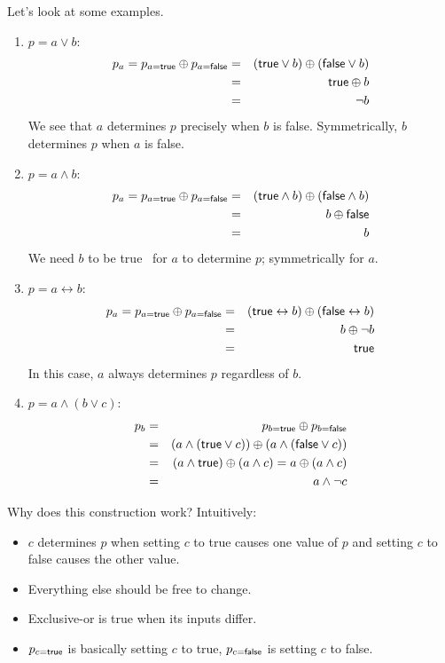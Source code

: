 \documentclass[11pt]{article}
\newcommand{\strue}{\mbox{\scriptsize \sf true}}
\newcommand{\sfalse}{\mbox{\scriptsize \sf false}}
\newcommand{\true}{\mbox{\sf true}}
\newcommand{\false}{\mbox{\sf false}}
\begin{document}
Let's look at some examples.

\begin{enumerate}
\item $p = a \vee b$:
\begin{eqnarray*}
p_a = p_{a=\strue} \oplus p_{a=\sfalse} &=& (\true \vee b) \oplus (\false \vee b) \\
&=& \true \oplus b \\
&=& \neg b
\end{eqnarray*}
We see that $a$ determines $p$ precisely when $b$ is false. Symmetrically, $b$ determines $p$ when $a$ is false.
\item $p = a \wedge b$:
\begin{eqnarray*}
p_a = p_{a=\strue} \oplus p_{a=\sfalse} &=& (\true \wedge b) \oplus (\false \wedge b) \\
&=& b \oplus \false \\
&=& b
\end{eqnarray*}
We need $b$ to be \true~ for $a$ to determine $p$; symmetrically for $a$.
\item $p = a \leftrightarrow b$:
\begin{eqnarray*}
p_a = p_{a=\strue} \oplus p_{a=\sfalse} &=& (\true \leftrightarrow b) \oplus (\false \leftrightarrow b) \\
&=& b \oplus \neg b \\
&=& \true
\end{eqnarray*}
In this case, $a$ always determines $p$ regardless of $b$.
\item $p = a \wedge (b \vee c)$:
\begin{eqnarray*}
p_b &=& p_{b=\strue} \oplus p_{b=\sfalse} \\
&=& (a \wedge (\true \vee c)) \oplus (a \wedge (\false \vee c)) \\
&=& (a \wedge \true) \oplus (a \wedge c) = a \oplus (a \wedge c) \\
&=& a \wedge \neg c
\end{eqnarray*}
\end{enumerate}

Why does this construction work? Intuitively:
\begin{itemize}
\item $c$ determines $p$ when setting $c$ to true causes one value of $p$
and setting $c$ to false causes the other value.
\item Everything else should be free to change.
\item Exclusive-or is true when its inputs differ.
\item $p_{c = \strue}$ is basically setting $c$ to \true, $p_{c = \sfalse}$
 is setting $c$ to false.
\end{itemize}
\end{document}
